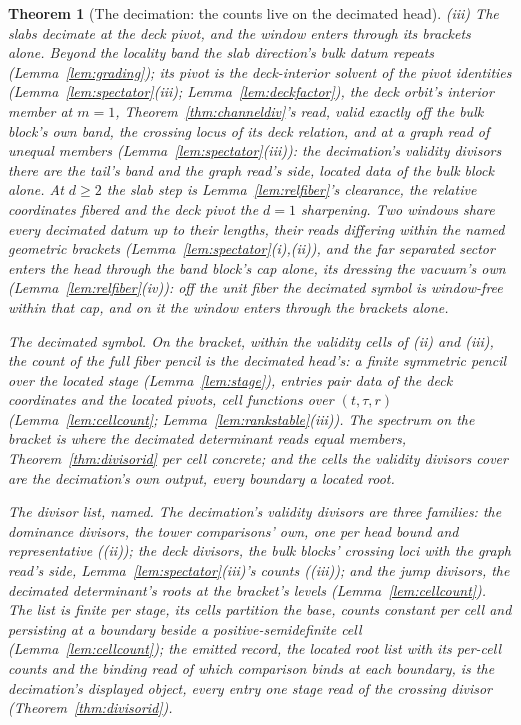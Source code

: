\documentclass[11pt]{article}
\newtheorem{theorem}{Theorem}
\theoremstyle{definition}
\begin{document}
\begin{theorem}[The decimation: the counts live on the decimated head]
\emph{(iii) The slabs decimate at the deck pivot, and the window enters
through its brackets alone.} Beyond the locality band the slab direction's bulk
datum repeats (Lemma~\ref{lem:grading}); its pivot is the
deck-interior solvent of the pivot identities
(Lemma~\ref{lem:spectator}(iii); Lemma~\ref{lem:deckfactor}), the
deck orbit's interior member at $m=1$,
Theorem~\ref{thm:channeldiv}'s read,
valid exactly off the bulk block's own band, the crossing locus of its
deck relation, and at a graph read of unequal members
(Lemma~\ref{lem:spectator}(iii)): the decimation's validity divisors there
are the tail's band and the graph read's side, located data
of the bulk block alone. At
$d\ge2$ the slab step is Lemma~\ref{lem:relfiber}'s clearance, the
relative coordinates fibered and the deck pivot the $d=1$ sharpening.
Two windows share every decimated datum up to their lengths, their reads
differing within the named geometric brackets
(Lemma~\ref{lem:spectator}(i),(ii)), and the far separated sector
enters the head through the band block's cap alone, its dressing
the vacuum's own (Lemma~\ref{lem:relfiber}(iv)): off the unit fiber
the decimated symbol is window-free within that cap, and on it the
window enters through the brackets alone.

\emph{The decimated symbol.} On the bracket, within the validity cells of
(ii) and (iii), the count of the full fiber pencil is the decimated
head's: a finite symmetric pencil over the located stage
(Lemma~\ref{lem:stage}), entries pair data of the deck
coordinates and the located pivots, cell functions over $(t,\tau,r)$
(Lemma~\ref{lem:cellcount}; Lemma~\ref{lem:rankstable}(iii)). The
spectrum on the bracket is where the decimated determinant reads equal
members,
Theorem~\ref{thm:divisorid} per cell concrete; and the cells the
validity divisors cover are the decimation's own output, every boundary a
located root.

\emph{The divisor list, named.} The decimation's validity divisors are three
families: the \emph{dominance divisors}, the tower comparisons' own,
one per head bound and representative ((ii)); the \emph{deck divisors},
the bulk blocks' crossing loci with the graph read's side,
Lemma~\ref{lem:spectator}(iii)'s
counts ((iii)); and the \emph{jump divisors}, the decimated determinant's
roots at the bracket's levels (Lemma~\ref{lem:cellcount}). The list is
finite per stage, its cells partition the base, counts constant per
cell and persisting at a boundary beside a positive-semidefinite
cell (Lemma~\ref{lem:cellcount}); the emitted record, the located root
list with its per-cell counts and the binding read of which comparison
binds at each boundary, is the decimation's displayed object, every entry one
stage read of the crossing divisor (Theorem~\ref{thm:divisorid}).

\end{theorem}
\end{document}
